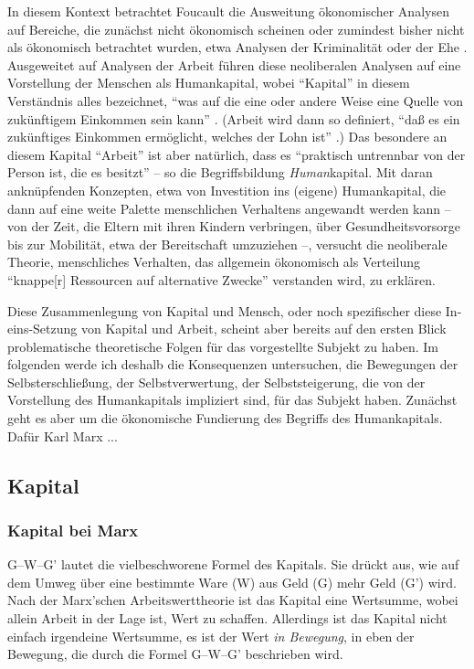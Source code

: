 \documentclass[12pt,
               DIV13,
               paper=a4,
               twoside=false,
               onehalfspacing,
               bibliography=totoc,
               toc=graduated,
               draft,
               ]{scrartcl}
\newcommand{\pc}[2]{\parencite[#1]{#2}}
\newcommand{\vgl}[2]{\parencite[vgl.][#1]{#2}}
\newcommand{\worries}[1]{\ifdraft{\textcolor{blue}{\texttt{(#1)}}}{}}
\newcommand{\gwg}{G--W--G'\xspace}
\begin{document}
In diesem Kontext betrachtet Foucault die Ausweitung ökonomischer
Analysen auf Bereiche, die zunächst nicht ökonomisch scheinen oder
zumindest bisher nicht als ökonomisch betrachtet wurden, etwa Analysen
der Kriminalität oder der Ehe \vgl{367}{gbp}. Ausgeweitet auf Analysen
der Arbeit führen diese neoliberalen Analysen auf eine Vorstellung der
Menschen als Humankapital, wobei "`Kapital"' in diesem Verständnis
alles bezeichnet, "`was auf die eine oder andere Weise eine Quelle von
zukünftigem Einkommen sein kann"' \pc{312}{gbp}. (Arbeit wird dann so
definiert, "`daß es ein zukünftiges Einkommen ermöglicht, welches der
Lohn ist"' \pc{312}{gbp}.) Das besondere an diesem Kapital "`Arbeit"'
ist aber natürlich, dass es "`praktisch untrennbar von der Person ist,
die es besitzt"' \pc{312}{gbp} -- so die Begriffsbildung
\emph{Human}kapital. Mit daran anknüpfenden Konzepten, etwa von
Investition ins (eigene) Humankapital, die dann auf eine weite Palette
menschlichen Verhaltens angewandt werden kann -- von der Zeit, die
Eltern mit ihren Kindern verbringen, über Gesundheitsvorsorge bis zur
Mobilität, etwa der Bereitschaft umzuziehen \vgl{320}{gbp} --,
versucht die neoliberale Theorie, menschliches Verhalten, das
allgemein ökonomisch als Verteilung "`knappe[r] Ressourcen auf
alternative Zwecke"' \pc{310}{gbp} verstanden wird, zu erklären.

Diese Zusammenlegung von Kapital und Mensch, oder noch spezifischer
diese In-eins-Set\-zung von Kapital und Arbeit, scheint aber bereits
auf den ersten Blick problematische theoretische \worries{und
praktische?} Folgen für das vorgestellte Subjekt zu haben. Im
folgenden werde ich deshalb die Konsequenzen untersuchen, die
Bewegungen der Selbsterschließung, der Selbstverwertung, der
Selbststeigerung, die von der Vorstellung des Humankapitals impliziert
sind, für das Subjekt haben. Zunächst geht es aber um die ökonomische
Fundierung des Begriffs des Humankapitals. Dafür Karl Marx ...

\worries{Warum Marx?}

\newpage

\subsection{Kapital}

\subsubsection{Kapital bei Marx}

\gwg lautet die vielbeschworene Formel des Kapitals. Sie drückt aus, wie
auf dem Umweg über eine bestimmte Ware (W) aus Geld (G) mehr Geld (G')
wird. Nach der Marx'schen Arbeitswerttheorie ist das Kapital eine
Wertsumme, wobei allein Arbeit in der Lage ist, Wert zu schaffen.
Allerdings ist das Kapital nicht einfach irgendeine Wertsumme, es ist
der Wert \emph{in Bewegung}, in eben der Bewegung, die durch die
Formel \gwg beschrieben wird.
\end{document}
